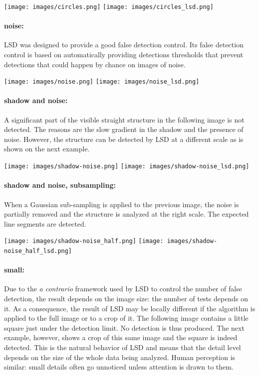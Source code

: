 \documentclass{ipol}
\begin{document}
\begin{center}
\texttt{[image: images/circles.png]}
\texttt{[image: images/circles\_lsd.png]}
\end{center}

\paragraph{noise:} LSD was designed to provide a good false detection
control. Its false detection control is based on automatically
providing detections thresholds that prevent detections that could
happen by chance on images of noise.

\begin{center}
\texttt{[image: images/noise.png]}
\texttt{[image: images/noise\_lsd.png]}
\end{center}

\paragraph{shadow and noise:} A significant part of the visible straight
structure in the following image is not detected. The reasons are the
slow gradient in the shadow and the presence of noise. However, the
structure can be detected by LSD at a different scale as is shown on
the next example.

\begin{center}
\texttt{[image: images/shadow-noise.png]}
\texttt{[image: images/shadow-noise\_lsd.png]}
\end{center}

\paragraph{shadow and noise, subsampling:} When a Gaussian sub-sampling
is applied to the previous image, the noise is partially removed and
the structure is analyzed at the right scale. The expected line
segments are detected.

\begin{center}
\texttt{[image: images/shadow-noise\_half.png]}
\texttt{[image: images/shadow-noise\_half\_lsd.png]}
\end{center}

\paragraph{small:} Due to the \emph{a contrario} framework used
by LSD to control the number of false detection, the result depends on
the image size: the number of tests depends on it. As a consequence,
the result of LSD may be locally different if the algorithm is applied
to the full image or to a crop of it. The following image contains a
little square just under the detection limit. No detection is thus
produced. The next example, however, shows a crop of this same image
and the square is indeed detected. This is the natural behavior of LSD
and means that the detail level depends on the size of the whole data
being analyzed. Human perception is similar: small details often go
unnoticed unless attention is drawn to them.
\end{document}
